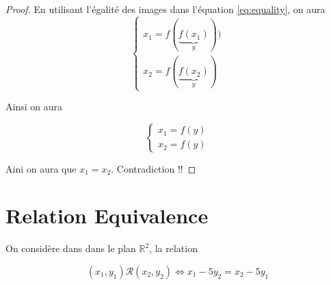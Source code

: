 \documentclass[12pt,a4paper,dvipsnames]{article}
\begin{document}
\begin{itemize}
\begin{proof}
  En utilisant l'égalité des images dans l'équation \eqref{eq:equality}, on aura
  \begin{equation*}
    \left\{\begin{array}{l}
        x_1 = f(\underbrace{f(x_1)}_{y}))\\[10pt]
        x_2 = f(\underbrace{f(x_2)}_{y})
    \end{array}
    \right.
  \end{equation*}

  Ainsi on aura 

  \begin{equation*}
    \left\{\begin{array}{l}
        x_1 = f(y)\\[10pt]
        x_2 = f(y)
    \end{array}
    \right.
  \end{equation*}

Aini on aura que $x_1=x_2$. Contradiction !!

\end{proof}

\end{itemize}
\section{Relation Equivalence}%
\label{sec:relation_equivalence}

On considère dans  dans le plan $\mathbb{R}^2$, la relation 

\begin{equation}
    \label{eq:relation_equiv}
    (x_1, y_1) \mathcal{R} (x_2, y_2) \iff x_1 - 5y_2 = x_2 - 5y_1
\end{equation}
\end{document}
